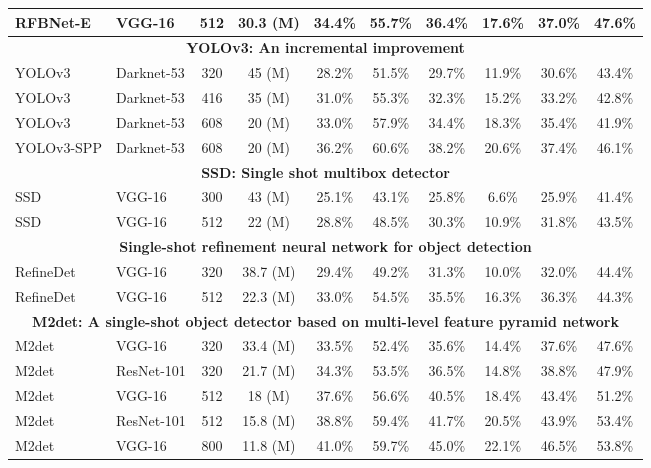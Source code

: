 \documentclass[10pt,twocolumn,letterpaper]{article}
\begin{document}
\begin{table*}[h]
\begin{threeparttable}[h]
\begin{tabular}{llcccccccc}
			\rowcolor{cyan}RFBNet-E & VGG-16 & 512 & 30.3 (M) & 34.4\% & 55.7\% & 36.4\% & 17.6\% & 37.0\% & 47.6\% \\
			\midrule
			\multicolumn{10}{c}{\textbf{YOLOv3: An incremental improvement} \cite{redmon2018yolov3}} \\
			\rowcolor{cyan}YOLOv3 & Darknet-53 & 320 & 45 (M) & 28.2\% & 51.5\% & 29.7\% & 11.9\% & 30.6\% & 43.4\% \\
			\rowcolor{cyan}YOLOv3 & Darknet-53 & 416 & 35 (M) & 31.0\% & 55.3\% & 32.3\% & 15.2\% & 33.2\% & 42.8\% \\
			YOLOv3 & Darknet-53 & 608 & 20 (M) & 33.0\% & 57.9\% & 34.4\% & 18.3\% & 35.4\% & 41.9\% \\
			YOLOv3-SPP & Darknet-53 & 608 & 20 (M) & 36.2\% & 60.6\% & 38.2\% & 20.6\% & 37.4\% & 46.1\% \\
			\midrule
			\multicolumn{10}{c}{\textbf{SSD: Single shot multibox detector} \cite{liu2016ssd}} \\
			\rowcolor{cyan}SSD & VGG-16 & 300 & 43 (M) & 25.1\% & 43.1\% & 25.8\% & 6.6\% & 25.9\% & 41.4\% \\
			SSD & VGG-16 & 512 & 22 (M) & 28.8\% & 48.5\% & 30.3\% & 10.9\% & 31.8\% & 43.5\% \\
			\midrule
			\multicolumn{10}{c}{\textbf{Single-shot refinement neural network for object detection} \cite{zhang2018single}} \\
			\rowcolor{cyan}RefineDet & VGG-16 & 320 & 38.7 (M) & 29.4\% & 49.2\% & 31.3\% & 10.0\% & 32.0\% & 44.4\% \\
			RefineDet & VGG-16 & 512 & 22.3 (M) & 33.0\% & 54.5\% & 35.5\% & 16.3\% & 36.3\% & 44.3\% \\
			\midrule
			\multicolumn{10}{c}{\textbf{M2det: A single-shot object detector based on multi-level feature pyramid network} \cite{zhao2019m2det}} \\
			\rowcolor{cyan}M2det & VGG-16 & 320 & 33.4 (M) & 33.5\% & 52.4\% & 35.6\% & 14.4\% & 37.6\% & 47.6\% \\
			M2det & ResNet-101 & 320 & 21.7 (M) & 34.3\% & 53.5\% & 36.5\% & 14.8\% & 38.8\% & 47.9\% \\
			M2det & VGG-16 & 512 & 18 (M) & 37.6\% & 56.6\% & 40.5\% & 18.4\% & 43.4\% & 51.2\% \\
			M2det & ResNet-101 & 512 & 15.8 (M) & 38.8\% & 59.4\% & 41.7\% & 20.5\% & 43.9\% & 53.4\% \\
			M2det & VGG-16 & 800 & 11.8 (M) & 41.0\% & 59.7\% & 45.0\% & 22.1\% & 46.5\% & 53.8\% \\

\end{tabular}
\end{threeparttable}
\end{table*}
\end{document}
